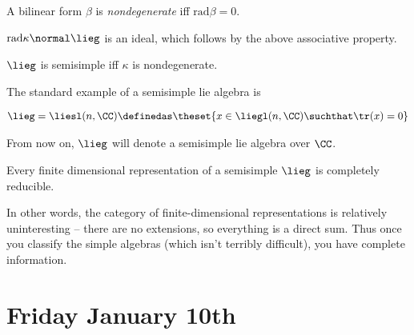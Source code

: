 \begin{definition}

A bilinear form \(\beta\) is \emph{nondegenerate} iff
\(\mathrm{rad}\beta = 0\).

\end{definition}

\begin{lemma}[?]

\(\mathrm{rad}\kappa \normal \lieg\) is an ideal, which follows by the
above associative property.

\end{lemma}

\begin{theorem}

\(\lieg\) is semisimple iff \(\kappa\) is nondegenerate.

\end{theorem}

\begin{example}[?]

The standard example of a semisimple lie algebra is

\begin{align*}
\lieg = \liesl(n, \CC) \definedas \theset{x\in \liegl(n, \CC) \suchthat \tr(x) = 0 }
\end{align*}

\end{example}

\begin{remark}

From now on, \(\lieg\) will denote a semisimple lie algebra over
\(\CC\).

\end{remark}

\begin{theorem}

Every finite dimensional representation of a semisimple \(\lieg\) is
completely reducible.

\end{theorem}

In other words, the category of finite-dimensional representations is
relatively uninteresting -- there are no extensions, so everything is a
direct sum. Thus once you classify the simple algebras (which isn't
terribly difficult), you have complete information.

\hypertarget{friday-january-10th}{%
\section{Friday January 10th}\label{friday-january-10th}}

